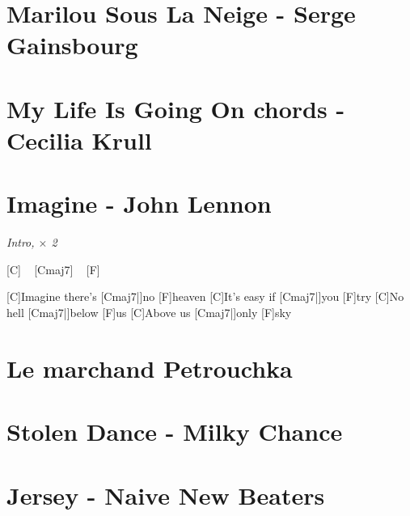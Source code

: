 \documentclass{guitartabs}
\begin{document}
\section{Marilou Sous La Neige - Serge Gainsbourg}
\begin{guitar}

\end{guitar}



\section{My Life Is Going On chords - Cecilia Krull }
\begin{guitar}

\end{guitar}


\section{Imagine - John Lennon}

\begin{guitar}


\emph{Intro, $\times$ 2}%

[C] ~ [Cmaj7]  ~ [F]  ~  %

[C]Imagine there's [Cmaj7|]{no} [F]heaven
[C]It's easy if [Cmaj7|]{you} [F]try
[C]No hell [Cmaj7|]{below} [F]us
[C]Above us [Cmaj7|]{only} [F]sky
\end{guitar}


\section{Le marchand Petrouchka}
\begin{guitar}

\end{guitar}


\section{Stolen Dance - Milky Chance}

\begin{guitar}

\end{guitar}


\section{Jersey - Naive New Beaters}
\begin{guitar}

\end{guitar}
\end{document}
